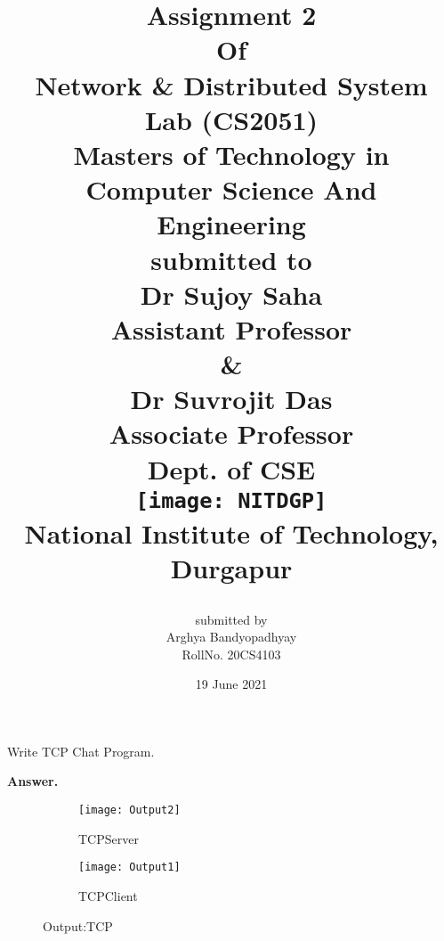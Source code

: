 \documentclass{article}
\author{\Large submitted by\\ Arghya Bandyopadhyay\\
    	RollNo. 20CS4103\\}
\title{\begin{center}
       \bfseries\Large
    	Assignment 2\\
    	Of\\
    	Network \& Distributed System Lab (CS2051)\\
        Masters of Technology in Computer Science And Engineering\\
    	\vskip1cm
    	submitted to\\
    	Dr Sujoy Saha\\
    	Assistant Professor\\
    	\&\\
    	Dr Suvrojit Das\\
    	Associate Professor\\
    	Dept. of CSE\\
    	\vskip1cm
    	\texttt{[image: NITDGP]}\\
    	National Institute of Technology, Durgapur\\
    \end{center}}
\date{19 June 2021}
\begin{document}
\maketitle
\pagebreak

Write TCP Chat Program.
\begin{flushleft}
\textbf{Answer.}
\end{flushleft}


\pagebreak

\pagebreak

\begin{figure}[h]
\begin{subfigure}{.5\textwidth}
\texttt{[image: Output2]}
\caption{TCPServer}
\label{TCPServer}
\end{subfigure}
\begin{subfigure}{.5\textwidth}
\texttt{[image: Output1]}
\caption{TCPClient}
\label{TCPClient}
\end{subfigure}
\caption{Output:TCP}
\label{fig:TCP}
\end{figure}
\end{document}
